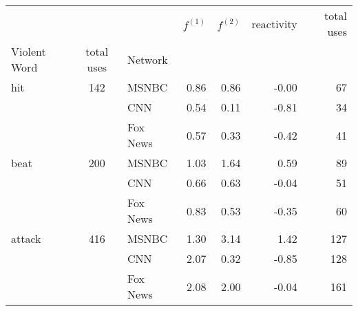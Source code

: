 \begin{tabular}{lclrrrr}
\toprule
       &  &   & $f^{(1)}$ & $f^{(2)}$ & reactivity & total uses \\
Violent Word & total uses & Network &           &            &            \\
\midrule
hit & 142 & MSNBC &      0.86 &      0.86 &      -0.00 &         67 \\
     && CNN &      0.54 &      0.11 &      -0.81 &         34 \\
     && Fox News &      0.57 &      0.33 &      -0.42 &         41 \\
     \hline
beat & 200 & MSNBC &      1.03 &      1.64 &       0.59 &         89 \\
     && CNN &      0.66 &      0.63 &      -0.04 &         51 \\
     && Fox News &      0.83 &      0.53 &      -0.35 &         60 \\
     \hline
attack & 416 & MSNBC &      1.30 &      3.14 &       1.42 &        127 \\
     && CNN &      2.07 &      0.32 &      -0.85 &        128 \\
     && Fox News &      2.08 &      2.00 &      -0.04 &        161 \\
\bottomrule
\end{tabular}
